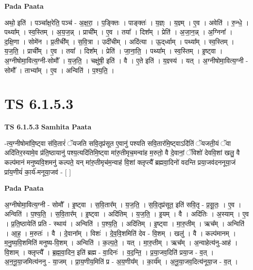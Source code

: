\documentclass[17pt]{extarticle}
\begin{document}
\textbf{Pada Paata} \newline

अथो॒ इति॑ । पञ्चा᳚क्ष॒रेति॒ पञ्च॑ - अ॒क्ष॒रा॒ । प॒ङ्क्तिः । पाङ्क्तः॑ । य॒ज्ञ्ः । य॒ज्ञ्म् । ए॒व । अवेति॑ । रु॒न्धे॒ । पथ्या᳚म् । स्व॒स्तिम् । अ॒य॒ज॒न्न् । प्राची᳚म् । ए॒व । तया᳚ । दिश᳚म् । प्रेति॑ । अ॒जा॒न॒न्न् । अ॒ग्निना᳚ । द॒क्षि॒णा । सोमे॑न । प्र॒तीची᳚म् । स॒वि॒त्रा । उदी॑चीम् । अदि॑त्या । ऊ॒द्‌र्ध्वाम् । पथ्या᳚म् । स्व॒स्तिम् । य॒ज॒ति॒ । प्राची᳚म् । ए॒व । तया᳚ । दिश᳚म् । प्रेति॑ । जा॒ना॒ति॒ । पथ्या᳚म् । स्व॒स्तिम् । इ॒ष्ट्वा । अ॒ग्नीषोमा॒वित्य॒ग्नी-सोमौ᳚ । य॒ज॒ति॒ । चक्षु॑षी॒ इति॑ । वै । ए॒ते इति॑ । य॒ज्ञ्स्य॑ । यत् । अ॒ग्नीषोमा॒वित्य॒ग्नी - सोमौ᳚ । ताभ्या᳚म् । ए॒व । अन्विति॑ । प॒श्य॒ति॒ ।  \newline




\section*{ TS 6.1.5.3 }

\textbf{TS 6.1.5.3 } \newline
\textbf{Samhita Paata} \newline

-त्य॒ग्नीषोमा॑वि॒ष्ट्वा स॑वि॒तारं॑ ॅयजति सवि॒तृप्र॑सूत ए॒वानु॑ पश्यति सवि॒तार॑मि॒ष्ट्वाऽदि॑तिं ॅयजती॒यं ॅवा अदि॑तिर॒स्यामे॒व प्र॑ति॒ष्ठायानु॑ पश्य॒त्यदि॑तिमि॒ष्ट्वा मा॑रु॒तीमृच॒मन्वा॑ह म॒रुतो॒ वै दे॒वानां॒ ॅविशो॑ देववि॒शां खलु॒ वै कल्प॑मानं मनुष्यवि॒शमनु॑ कल्पते॒ यन् मा॑रु॒तीमृच॑म॒न्वाह॑ वि॒शां क्लृप्त्यै᳚ ब्रह्मवा॒दिनो॑ वदन्ति प्रया॒जव॑दननूया॒जं प्रा॑य॒णीयं॑ का॒र्य॑-मनूया॒जव॑ - [  ] \newline

\textbf{Pada Paata} \newline

अ॒ग्नीषोमा॒वित्य॒ग्नी - सोमौ᳚ । इ॒ष्ट्वा । स॒वि॒तार᳚म् । य॒ज॒ति॒ । स॒वि॒तृप्र॑सूत॒ इति॑ सवि॒तृ - प्र॒सू॒तः॒ । ए॒व । अन्विति॑ । प॒श्य॒ति॒ । स॒वि॒तार᳚म् । इ॒ष्ट्वा । अदि॑तिम् । य॒ज॒ति॒ । इ॒यम् । वै । अदि॑तिः । अ॒स्याम् । ए॒व । प्र॒ति॒ष्ठायेति॑ प्रति - स्थाय॑ । अन्विति॑ । प॒श्य॒ति॒ । अदि॑तिम् । इ॒ष्ट्वा । मा॒रु॒तीम् । ऋच᳚म् । अन्विति॑ । आ॒ह॒ । म॒रुतः॑ । वै । दे॒वाना᳚म् । विशः॑ । दे॒व॒वि॒शमिति॑ देव - वि॒शम् । खलु॑ । वै । कल्प॑मानम् । म॒नु॒ष्य॒वि॒शमिति॑ मनुष्य-वि॒शम् । अन्विति॑ । क॒ल्प॒ते॒ । यत् । मा॒रु॒तीम् । ऋच᳚म् । अ॒न्वाहेत्य॑नु-आह॑ । वि॒शाम् । क्लृप्त्यै᳚ । ब्र॒ह्म॒वा॒दिन॒ इति॑ ब्रह्म - वा॒दिनः॑ । व॒द॒न्ति॒ । प्र॒या॒जव॒दिति॑ प्रया॒ज - व॒त् । अ॒न॒नू॒या॒जमित्य॑ननु - या॒जम् । प्रा॒य॒णीय॒मिति॑ प्र - अ॒य॒णीय᳚म् । का॒र्य᳚म् । अ॒नू॒या॒जव॒दित्य॑नूया॒ज - व॒त् ।  \newline
\end{document}
